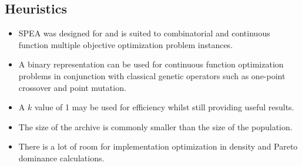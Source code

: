 \subsection{Heuristics}
\begin{itemize}
	\item SPEA was designed for and is suited to combinatorial and continuous function multiple objective optimization problem instances.
	\item A binary representation can be used for continuous function optimization problems in conjunction with classical genetic operators such as one-point crossover and point mutation.
	\item A $k$ value of 1 may be used for efficiency whilst still providing useful results.
	\item The size of the archive is commonly smaller than the size of the population.
	\item There is a lot of room for implementation optimization in density and Pareto dominance calculations.
\end{itemize}

